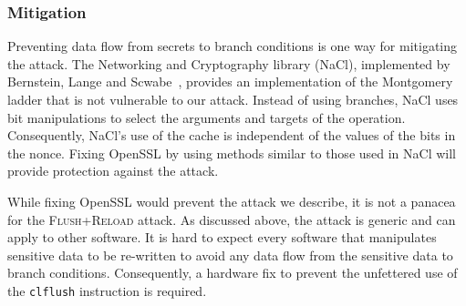 \documentclass[twocolumn]{svjour3}
\begin{document}
\subsubsection*{Mitigation}


Preventing data flow from secrets to branch conditions is one way for mitigating the attack.
The Networking and Cryptography library (NaCl), implemented by Bernstein, Lange and Scwabe~\cite{dan-tan-peter}, 
provides an implementation of the Montgomery ladder that is not vulnerable to our attack.
Instead of using branches, NaCl uses bit manipulations to select the arguments and targets of the operation.
Consequently, NaCl's use of the cache is independent of the values of the bits in the nonce.
Fixing OpenSSL by using methods similar to those used in NaCl will provide protection against the attack.

While fixing OpenSSL would prevent the attack we describe, it is not a panacea for the \textsc{Flush+Reload} attack.
As discussed above, the attack is generic and can apply to other software.
It is hard to expect every software that manipulates sensitive data to be re-written to
avoid any data flow from the sensitive data to branch conditions.
Consequently, a hardware fix to prevent the unfettered use of the \texttt{clflush} instruction is required.


\end{document}
